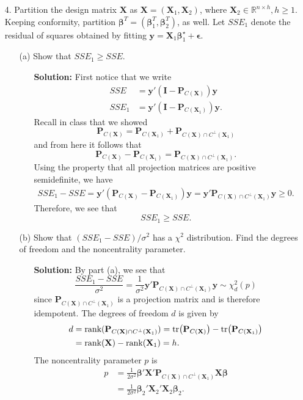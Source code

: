 \documentclass[11pt]{article}
\newcommand{\R}{{\mathbb R}}
\begin{document}
\begin{itemize}
\item[4.] Partition the design matrix $\mathbf{X}$ as $\mathbf{X} = (\mathbf{X}_1,\mathbf{X}_2)$, where $\mathbf{X}_2\in\R^{n\times h}, h\geq 1$.  Keeping conformity, partition $\bm\beta^T = (\bm\beta_1^T,\bm\beta_2^T)$, as well.  Let $SSE_1$ denote the residual of squares obtained by fitting $\mathbf{y} = \mathbf{X}_1\bm\beta_1^\star + \bm\epsilon$.
\begin{itemize}
\item[(a)] Show that $SSE_1 \geq SSE$.
\begin{itemize}
\item[] \textbf{Solution:}  First notice that we write
\begin{align*}
SSE &= \mathbf{y}'(\mathbf{I} - \mathbf{P}_{C(\mathbf{X})})\mathbf{y} \\
SSE_1 &= \mathbf{y}'(\mathbf{I} - \mathbf{P}_{C(\mathbf{X}_1)})\mathbf{y}.
\end{align*}
Recall in class that we showed
\[
\mathbf{P}_{C(\mathbf{X})} = \mathbf{P}_{C(\mathbf{X}_1)} + \mathbf{P}_{C(\mathbf{X})\cap C^\perp(\mathbf{X}_1)}
\]
and from here it follows that
\[
\mathbf{P}_{C(\mathbf{X})} - \mathbf{P}_{C(\mathbf{X}_1)} = \mathbf{P}_{C(\mathbf{X})\cap C^\perp(\mathbf{X}_1)}.
\]
Using the property that all projection matrices are positive semidefinite, we have
\begin{align*}
SSE_1 - SSE = \mathbf{y}'(\mathbf{P}_{C(\mathbf{X})} - \mathbf{P}_{C(\mathbf{X}_1)})\mathbf{y} = \mathbf{y}'\mathbf{P}_{C(\mathbf{X})\cap C^\perp(\mathbf{X}_1)}\mathbf{y} \geq 0.
\end{align*}
Therefore, we see that
\[
SSE_1 \geq SSE.
\]
\end{itemize}

\item[(b)] Show that $(SSE_1 - SSE) / \sigma^2$ has a $\chi^2$ distribution.  Find the degrees of freedom and the noncentrality parameter.
\begin{itemize}
\item[] \textbf{Solution:}  By part (a), we see that
\[
\frac{SSE_1-SSE}{\sigma^2} = \frac{1}{\sigma^2}\mathbf{y}'\mathbf{P}_{C(\mathbf{X})\cap C^\perp(\mathbf{X}_1)}\mathbf{y} \sim \chi^2_d(p)
\]
since $\mathbf{P}_{C(\mathbf{X})\cap C^\perp(\mathbf{X}_1)}$ is a projection matrix and is therefore idempotent.  The degrees of freedom $d$ is given by
\begin{align*}
d &= \text{rank}(\mathbf{P}_{C(\mathbf{X})\cap C^\perp(\mathbf{X}_1)}) = \text{tr}\big{(}\mathbf{P}_{C(\mathbf{X})}\big{)} - \text{tr}\big{(}\mathbf{P}_{C(\mathbf{X}_1)}\big{)} \\
&= \text{rank}(\mathbf{X}) - \text{rank}(\mathbf{X}_1) = h.
\end{align*}
The noncentrality parameter $p$ is 
\begin{align*}
p &= \frac{1}{2\sigma^2}\bm\beta'\mathbf{X}'\mathbf{P}_{C(\mathbf{X})\cap C^\perp(\mathbf{X}_1)}\mathbf{X}\bm\beta \\
&= \frac{1}{2\sigma^2}\bm\beta_2'\mathbf{X}_2'\mathbf{X}_2\bm\beta_2.
\end{align*}
\end{itemize}


\end{itemize}
\end{itemize}
\end{document}
